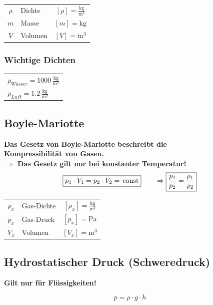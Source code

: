 	\begin{tabular}{c l c}
		$\rho$ & Dichte & $[\rho] = \mathrm{\frac{kg}{m^3}}$ \\
		$m$ & Masse & $[m] = \mathrm{kg} $ \\
		$V$ & Volumen & $[V] = \mathrm{m^3}$ \\
	\end{tabular}
	
	
\subsubsection{Wichtige Dichten}	
	
	\begin{tabular}{l}
		$\rho_{Wasser} = 1000 \, \mathrm{\frac{kg}{m^3}}  $ \\
		$\rho_{Luft} = 1.2 \, \mathrm{\frac{kg}{m^3}}  $ \\
	\end{tabular}
	
	
	
\vfill\null
\columnbreak
	
\subsection{Boyle-Mariotte}	
\textbf{Das Gesetz von Boyle-Mariotte beschreibt die \\
Kompressibilität von Gasen.} \\
\textbf{$\Rightarrow$ Das Gesetz gilt nur bei konstanter Temperatur!} \\

$$ \boxed{ p_1 \cdot V_1 = p_2 \cdot V_2 = \, \mathrm{const} } \qquad  \Rightarrow  \boxed{ \frac{p_1}{p_2} = \frac{\rho_1}{\rho_2} }$$ 


	\begin{tabular}{c l c}
		\rule{0pt}{8pt}$\rho_x$ & Gas-Dichte & $[\rho_x] = \mathrm{\frac{kg}{m^3}}$ \\
		$p_x$ & Gas-Druck & $[p_x] = \mathrm{Pa} $ \\
		$V_x$ & Volumen & $[V_x] = \mathrm{m^3}$ \\
	\end{tabular}
	
	
	
\subsection{Hydrostatischer Druck (Schweredruck)}
\textbf{Gilt nur für Flüssigkeiten!} 

$$ \boxed{ p = \rho \cdot g \cdot h }$$	


